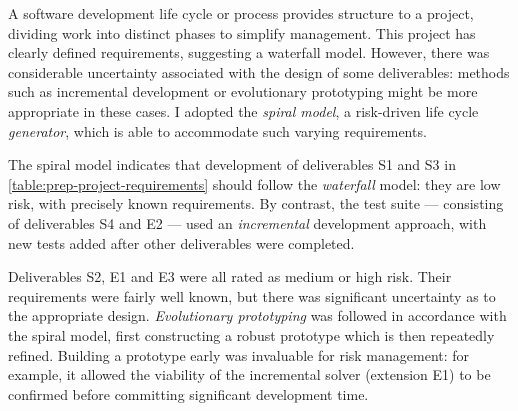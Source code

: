 



A software development life cycle or process provides structure to a project, dividing work into distinct phases to simplify management. This project has clearly defined requirements, suggesting a waterfall model. However, there was considerable uncertainty associated with the design of some deliverables: methods such as incremental development or evolutionary prototyping might be more appropriate in these cases. I adopted the \emph{spiral model}, a risk-driven life cycle \emph{generator}, which is able to accommodate such varying requirements.

The spiral model indicates that development of deliverables S1 and S3 in \cref{table:prep-project-requirements} should follow the \emph{waterfall} model: they are low risk, with precisely known requirements. By contrast, the test suite --- consisting of deliverables S4 and E2 --- used an \emph{incremental} development approach, with new tests added after other deliverables were completed.

Deliverables S2, E1 and E3 were all rated as medium or high risk. Their requirements were fairly well known, but there was significant uncertainty as to the appropriate design. \emph{Evolutionary prototyping} was followed in accordance with the spiral model, first constructing a robust prototype which is then repeatedly refined. Building a prototype early was invaluable for risk management: for example, it allowed the viability of the incremental solver (extension E1) to be confirmed before committing significant development time.

